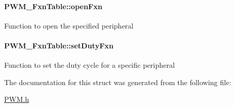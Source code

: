 \paragraph[{open\-Fxn}]{ P\-W\-M\-\_\-\-Fxn\-Table\-::open\-Fxn}\label{struct_p_w_m___fxn_table_aca1bd99df949b2e0121ff90598279441}
Function to open the specified peripheral 
\paragraph[{set\-Duty\-Fxn}]{ P\-W\-M\-\_\-\-Fxn\-Table\-::set\-Duty\-Fxn}\label{struct_p_w_m___fxn_table_a766700e0a02097f9fd2d332b71082605}
Function to set the duty cycle for a specific peripheral 

The documentation for this struct was generated from the following file\-:\begin{DoxyCompactItemize}
\item 
\hyperlink{_p_w_m_8h}{P\-W\-M.\-h}\end{DoxyCompactItemize}

